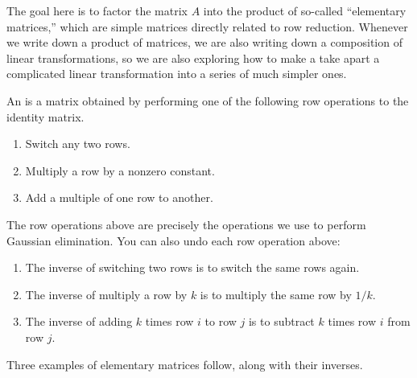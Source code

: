 The goal here is to factor the matrix $A$ into the product of so-called ``elementary matrices,'' which are simple matrices directly related to row reduction.  Whenever we write down a product of matrices, we are also writing down a composition of linear transformations, so we are also exploring how to make a take apart a complicated linear transformation into a series of much simpler ones.

\begin{definition}
An  is a matrix obtained by performing one of the following row operations to the identity matrix.
\begin{enumerate}
	\item Switch any two rows.
	\item Multiply a row by a nonzero constant.
	\item Add a multiple of one row to another.
\end{enumerate}
\end{definition}
The row operations above are precisely the operations we use to perform Gaussian elimination. 
You can also undo each row operation above:
\begin{enumerate}
	\item The inverse of switching two rows is to switch the same rows again.  
	\item The inverse of multiply a row by $k$ is to multiply the same row by $1/k$.  
	\item The inverse of adding $k$ times row $i$ to row $j$ is to subtract $k$ times row $i$ from row $j$. 
\end{enumerate}
Three examples of elementary matrices follow, along with their inverses.
